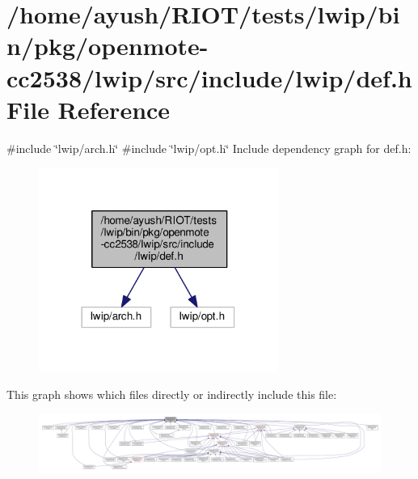 \hypertarget{openmote-cc2538_2lwip_2src_2include_2lwip_2def_8h}{}\section{/home/ayush/\+R\+I\+O\+T/tests/lwip/bin/pkg/openmote-\/cc2538/lwip/src/include/lwip/def.h File Reference}
\label{openmote-cc2538_2lwip_2src_2include_2lwip_2def_8h}
{\ttfamily \#include \char`\"{}lwip/arch.\+h\char`\"{}}\newline
{\ttfamily \#include \char`\"{}lwip/opt.\+h\char`\"{}}\newline
Include dependency graph for def.\+h\+:
\nopagebreak
\begin{figure}[H]
\begin{center}
\leavevmode
\includegraphics[width=222pt]{openmote-cc2538_2lwip_2src_2include_2lwip_2def_8h__incl}
\end{center}
\end{figure}
This graph shows which files directly or indirectly include this file\+:
\nopagebreak
\begin{figure}[H]
\begin{center}
\leavevmode
\includegraphics[width=350pt]{openmote-cc2538_2lwip_2src_2include_2lwip_2def_8h__dep__incl}
\end{center}
\end{figure}
